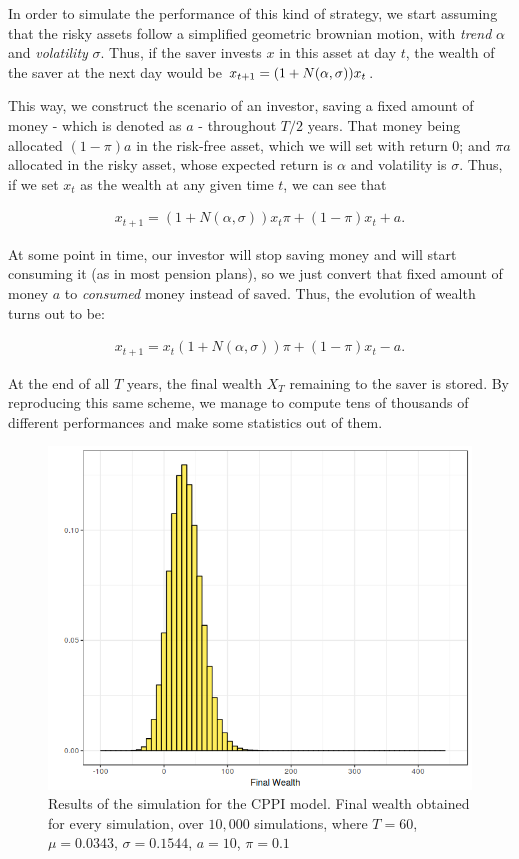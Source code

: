 In order to simulate the performance of this kind of strategy, we start assuming that the risky assets follow a simplified geometric brownian motion, with \emph{trend} $\alpha$ and \emph{volatility} $\sigma$. Thus, if the saver invests $x$ in this asset at day $t$, the wealth of the saver at the next day would be $x_{t+1} = (1 + N\qty(\alpha, \sigma)) x_t$.

This way, we construct the scenario of an investor, saving a fixed amount of money - which is denoted as $a$ -   throughout $T/2$ years. That money being allocated $( 1 - \pi) a$ in the risk-free asset, which we will set with return 0; and $\pi a$ allocated in the risky asset, whose expected return is $\alpha$ and volatility is $\sigma$. Thus, if we set $x_t$ as the wealth at any given time $t$, we can see that

\begin{align}
	x_{t+1} = (1+N(\alpha, \sigma))x_{t}\pi + (1 - \pi)x_{t} + a \textit{.}
\end{align}

At some point in time, our investor will stop saving money and will start consuming it (as in most pension plans), so we just convert that fixed amount of money $a$ to \emph{consumed} money instead of saved. Thus, the evolution of wealth turns out to be:

\begin{align}
	x_{t+1} = x_{t}(1+N(\alpha, \sigma))\pi + (1 - \pi)x_{t} - a \textit{.}
\end{align}

At the end of all $T$ years, the final wealth $X_T$ remaining to the saver is stored. By reproducing this same scheme, we manage to compute tens of thousands of different performances and make some statistics out of them.

\begin{figure}[H]
    \centering
    \includegraphics[scale=0.65]{./images/fw_cppi.png}
    \caption{Results of the simulation for the CPPI model. Final wealth obtained for every simulation, over $10,000$ simulations, where $T=60$, $\mu = 0.0343$, $\sigma = 0.1544$, $a=10$, $\pi = 0.1$}
    \label{fig:cppi_fw}
\end{figure}

